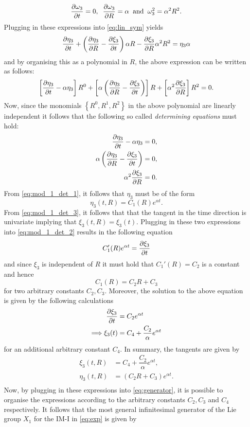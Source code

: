 $$\pdv{\omega_3}{t}=0,\;\;\pdv{\omega_3}{R}=\alpha\;\;\mathrm{and}\;\;\omega_3^2=\alpha^2R^2 .$$
Plugging in these expressions into \eqref{eq:lin_sym} yields
$$\pdv{\eta_3}{t}+\left(\pdv{\eta_3}{R}-\pdv{\xi_3}{t}\right)\alpha R-\pdv{\xi_3}{R}\alpha^2R^2=\eta_3\alpha$$
and by organising this as a polynomial in $R$, the above expression can be written as follows:
$$\left[\pdv{\eta_3}{t}-\alpha\eta_3\right]R^0+\left[\alpha\left(\pdv{\eta_3}{R}-\pdv{\xi_3}{t}\right)\right]R+\left[\alpha^2\pdv{\xi_3}{R}\right]R^2=0 .$$
Now, since the monomials $\left\{R^0,R^1,R^2\right\}$ in the above polynomial are linearly independent it follows that the following so called \textit{determining equations} \cite{hydon2000symmetry} must hold:
\begin{align}
  \pdv{\eta_3}{t}-\alpha\eta_3&=0,\label{eq:mod_1_det_1}\\
  \alpha\left(\pdv{\eta_3}{R}-\pdv{\xi_3}{t}\right)&=0,\label{eq:mod_1_det_2}\\
  \alpha^2\pdv{\xi_3}{R}&=0.\label{eq:mod_1_det_3}
\end{align}
From \eqref{eq:mod_1_det_1}, it follows that $\eta_3$ must be of the form
$$\eta_{3}(t,R)=C_1(R)e^{\alpha t} .$$
From \eqref{eq:mod_1_det_3}, it follows that that the tangent in the time direction is univariate implying that $\xi_3(t,R)=\xi_3(t)$. Plugging in these two expressions into \eqref{eq:mod_1_det_2} results in the following equation
$$C_1'(R)e^{\alpha t}=\pdv{\xi_3}{t}$$
and since $\xi_3$ is independent of $R$ it must hold that $C_1'(R)=C_2$ is a constant and hence
$$C_1(R)=C_2R+C_3$$
for two arbitrary constants $C_2,C_3$. Moreover, the solution to the above equation is given by the following calculations
\begin{align*}
  \pdv{\xi_3}{t}&=C_2e^{\alpha t}\\
  \Longrightarrow \xi_3(t)&=C_4+\dfrac{C_2}{\alpha}e^{\alpha t}
\end{align*}
for an additional arbitrary constant $C_4$. In summary, the tangents are given by
\begin{align*}
  \xi_3(t,R)&=C_4+\dfrac{C_2}{\alpha}e^{\alpha t},\\
  \eta_3(t,R)&= \left(C_2R+C_3\right)e^{\alpha t}.\\   
\end{align*}
Now, by plugging in these expressions into \eqref{eq:generator}, it is possible to organise the expressions according to the arbitrary constants $C_2,C_3$ and $C_4$ respectively. It follows that the most general infinitesimal generator of the Lie group $X_1$ for the IM-I in \eqref{eq:exp} is given by
